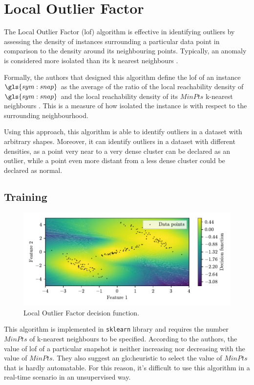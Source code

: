 \section{Local Outlier Factor}
\label{sec:LocalOutlierFactor}


The Local Outlier Factor (\gls{lof}) algorithm is effective in identifying outliers by assessing the density of instances surrounding a particular data point in comparison to the density around its neighbouring points. Typically, an anomaly is considered more isolated than its k nearest neighbours . 

Formally, the authors that designed this algorithm define the \gls{lof} of an instance $\gls{sym:snap}$ as the average of the ratio of the local reachability density of $\gls{sym:snap}$ and the local reachability density of its $MinPts$ k-nearest neighbours \cite{breunig2000lof}. This is a measure of how isolated the instance is with respect to the surrounding neighbourhood. 

Using this approach, this algorithm is able to identify outliers in a dataset with arbitrary shapes. Moreover, it can identify outliers in a dataset with different densities, as a point very near to a very dense cluster can be declared as an outlier, while a point even more distant from a less dense cluster could be declared as normal.

\subsection{Training}
\label{sec:lof_train}
\begin{figure}
    \centering
    \includegraphics{images/LOF/Figure_1.pdf}
    \caption{Local Outlier Factor decision function.}
    \label{fig:LocalOutlierFactor}
\end{figure}
This algorithm is implemented in \texttt{sklearn} library and requires the number $MinPts$ of k-nearest neighbours to be specified. According to the authors, the value of \gls{lof} of a particular snapshot is neither increasing nor decreasing with the value of $MinPts$. They also suggest an \gls{glo:heuristic} to select the value of $MinPts$ that is hardly automatable. 
For this reason, it's difficult to use this algorithm in a real-time scenario in an unsupervised way.

